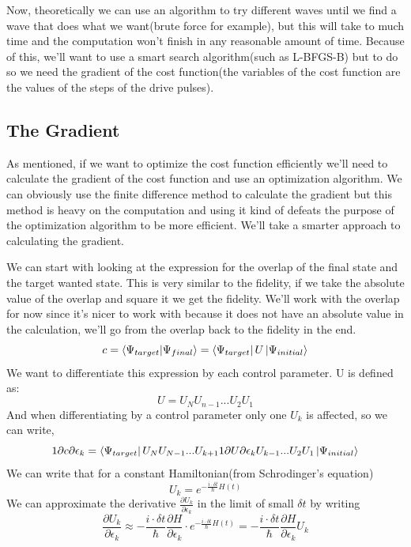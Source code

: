 \documentclass[english, a4paper, 12pt, twoside]{article}
\numberwithin{equation}{section} %
\begin{document}
Now, theoretically we can use an algorithm to try different waves until we find a wave that does what we want(brute force for example), but this will take to much time and the computation won't finish in any reasonable amount of time. Because of this, we'll want to use a smart search algorithm(such as L-BFGS-B) but to do so we need the gradient of the cost function(the variables of the cost function are the values of the steps of the drive pulses).

\subsection{The Gradient}
As mentioned, if we want to optimize the cost function efficiently we'll need to calculate the gradient of the cost function and use an optimization algorithm. We can obviously use the finite difference method to calculate the gradient but this method is heavy on the computation and using it kind of defeats the purpose of the optimization algorithm to be more efficient. We'll take a smarter approach to calculating the gradient.

We can start with looking at the expression for the overlap of the final state and the target wanted state. This is very similar to the fidelity, if we take the absolute value of the overlap and square it we get the fidelity. We'll work with the overlap for now since it's nicer to work with because it does not have an absolute value in the calculation, we'll go from the overlap back to the fidelity in the end.
\begin{equation} \label{def:overlap}
c = \braket{\Psi_{target}}{\Psi_{final}} = \bra{\Psi_{target}}U\ket{\Psi_{initial}}
\end{equation}
We want to differentiate this expression by each control parameter. U is defined as:
\[ U = U_N U_{n-1}...U_2 U_1 \]
And when differentiating by a control parameter only one $U_k$ is affected, so we can write,
\[
1{\partial c}{\partial \epsilon_k} = \bra{\Psi_{target}}U_N U_{N-1} ... U_{k+1}1{\partial U}{\partial \epsilon_k} U_{k-1} ...U_2 U_1\ket{\Psi_{initial}} 
\]
We can write that for a constant Hamiltonian(from Schrodinger's equation)
\[
    U_k = e^{-\frac{i\cdot \delta t}{\hbar}H(t)}
\]
We can approximate the derivative $\frac{\partial U_k}{\partial \epsilon_k}$ in the limit of small $\delta t$ by writing
\begin{equation*}
    \frac{\partial U_k}{\partial \epsilon_k} \approx -\frac{i\cdot \delta t}{\hbar}\frac{\partial H}{\partial \epsilon_k} \cdot e^{-\frac{i\cdot \delta t}{\hbar}H(t)} = -\frac{i\cdot \delta t}{\hbar}\frac{\partial H}{\partial \epsilon_k} U_k
\end{equation*}
\end{document}
